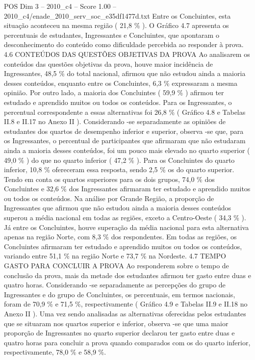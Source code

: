 \begin{textsample}{POS Dim 3 – 2010\_c4 – Score 1.00 – 2010\_c4/enade\_2010\_serv\_soc\_e35df1477d.txt}
Entre os Concluintes, esta situação aconteceu na mesma região ( 21,8 \% ).
O Gráfico 4.7 apresenta os percentuais de estudantes, Ingressantes e Concluintes, que apontaram o desconhecimento do conteúdo como dificuldade percebida ao responder à prova. 4.6 CONTEÚDOS DAS QUESTÕES OBJETIVAS DA PROVA Ao analisarem os conteúdos das questões objetivas da prova, houve maior incidência de Ingressantes, 48,5 \% do total nacional, afirmou que não estudou ainda a maioria desses conteúdos, enquanto entre os Concluintes, 6,3 \% expressaram a mesma opinião.
Por outro lado, a maioria dos Concluintes ( 59,9 \% ) afirmou ter estudado e aprendido muitos ou todos os conteúdos.
Para os Ingressantes, o percentual correspondente a essas alternativas foi 26,8 \% ( Gráfico 4.8 e Tabelas II.8 e II.17 no Anexo II ).
Considerando -se separadamente as opiniões de estudantes dos quartos de desempenho inferior e superior, observa -se que, para os Ingressantes, o percentual de participantes que afirmaram que não estudaram ainda a maioria desses conteúdos, foi um pouco mais elevado no quarto superior ( 49,0 \% ) do que no quarto inferior ( 47,2 \% ).
Para os Concluintes do quarto inferior, 10,8 \% ofereceram essa resposta, sendo 2,5 \% os do quarto superior.
Tendo em conta os quartos superiores para os dois grupos, 74,0 \% dos Concluintes e 32,6 \% dos Ingressantes afirmaram ter estudado e aprendido muitos ou todos os conteúdos.
Na análise por Grande Região, a proporção de Ingressantes que afirmou que não estudou ainda a maioria desses conteúdos superou a média nacional em todas as regiões, exceto a Centro-Oeste ( 34,3 \% ).
Já entre os Concluintes, houve superação da média nacional para esta alternativa apenas na região Norte, com 8,3 \% dos respondentes.
Em todas as regiões, os Concluintes afirmaram ter estudado e aprendido muitos ou todos os conteúdos, variando entre 51,1 \% na região Norte e 73,7 \% na Nordeste. 4.7 TEMPO GASTO PARA CONCLUIR A PROVA Ao responderem sobre o tempo de conclusão da prova, mais da metade dos estudantes afirmou ter gasto entre duas e quatro horas.
Considerando -se separadamente as percepções do grupo de Ingressantes e do grupo de Concluintes, os percentuais, em termos nacionais, foram de 70,9 \% e 71,5 \%, respectivamente ( Gráfico 4.9 e Tabelas II.9 e II.18 no Anexo II ).
Uma vez sendo analisadas as alternativas oferecidas pelos estudantes que se situaram nos quartos superior e inferior, observa -se que uma maior proporção de Ingressantes no quarto superior declarou ter gasto entre duas e quatro horas para concluir a prova quando comparados com os do quarto inferior, respectivamente, 78,0 \% e 58,9 \%.

\end{textsample}
